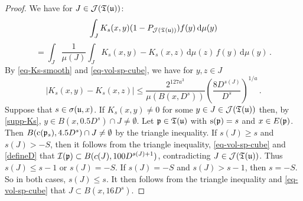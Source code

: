 \begin{proof}
    \leanok
    We have for $J \in \mathcal{J}({\mathfrak T}({\mathfrak u}))$:
    $$
        \int_J K_{s}(x,y)(1 - P_{\mathcal{J}({\mathfrak T}({\mathfrak u}))})f(y) \, \mathrm{d}\mu(y)
    $$
    \begin{equation}
    \label{eq-canc-comp}
        = \int_J \frac{1}{\mu(J)} \int_J K_s(x,y) - K_s(x,z) \, \mathrm{d}\mu(z) \,f(y) \, \mathrm{d}\mu(y)\,.
    \end{equation}
    By \eqref{eq-Ks-smooth} and \eqref{eq-vol-sp-cube}, we have for $y, z \in J$
    $$
        |K_s(x,y) - K_s(x,z)| \le \frac{2^{127a^3}}{\mu(B(x, D^s))} \left(\frac{8 D^{s(J)}}{D^s}\right)^{1/a}\,.
    $$
    Suppose that $s \in \sigma({\mathfrak u}, x)$.
    If $K_s(x,y) \ne 0$ for some $y \in J \in \mathcal{J}({\mathfrak T}({\mathfrak u}))$ then, by \eqref{supp-Ks}, $y \in B(x, 0.5 D^s) \cap J \ne \emptyset$. Let ${\mathfrak p} \in {\mathfrak T}({\mathfrak u})$ with ${\mathrm{s}}({\mathfrak p}) = s$ and $x \in E({\mathfrak p})$. Then $B({\mathrm{c}}({\mathfrak p}_s), 4.5D^s) \cap J \ne \emptyset$ by the triangle inequality. If $s(J) \ge s$ and $s(J) > -S$, then it follows from the triangle inequality, \eqref{eq-vol-sp-cube} and \eqref{defineD} that ${\mathcal{I}}({\mathfrak p}) \subset B(c(J), 100 D^{s(J)+1})$, contradicting $J \in \mathcal{J}(\mathfrak{T}({\mathfrak u}))$. Thus $s(J) \le s - 1$ or $s(J) = -S$. If $s(J) = -S$ and $s(J) > s - 1$, then $s = -S$. So in both cases, $s(J) \le s$. It then follows from the triangle inequality and \eqref{eq-vol-sp-cube} that $J \subset B(x, 16 D^s)$.


\end{proof}
